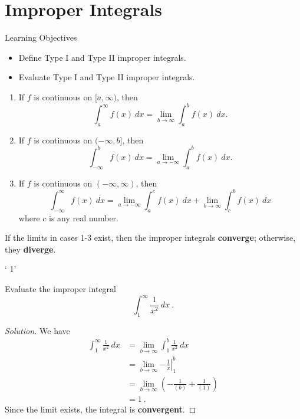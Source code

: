 \documentclass[compacto,10pt,comentarios]{aleph-notas}
\begin{document}
\encabezado

\section*{Improper Integrals}
\begin{mdframed}
    \center Learning Objectives \\
    \begin{itemize}
        \item Define Type I and Type II improper integrals.
        \item Evaluate Type I and Type II improper integrals.
    \end{itemize}
\end{mdframed}

\begin{defi}
    \begin{enumerate}
        \item If $f$ is continuous on $[a, \infty)$, then
        $$
            \int_{a}^{\infty} f(x) ~ dx = \lim_{b \to \infty} \int_{a}^{b} f(x) ~ dx.
        $$
        \item If $f$ is continuous on $(-\infty, b]$, then
        $$
            \int_{-\infty}^{b} f(x) ~ dx = \lim_{a \to -\infty} \int_{a}^{b} f(x) ~ dx .
        $$
        \item If $f$ is continuous on $(-\infty, \infty)$, then
        $$
            \int_{-\infty}^{\infty} f(x) ~ dx = \lim_{a \to -\infty} \int_{a}^{c} f(x) ~ dx + \lim_{b \to \infty} \int_{c}^{b} f(x) ~ dx 
        $$
        where $c$ is any real number.
    \end{enumerate}
    If the limits in cases 1-3 exist, then the improper integrals \textbf{converge}; otherwise, they \textbf{diverge}.
\end{defi}
`   1'
\begin{ejer}
    Evaluate the improper integral
    $$
        \int_{1}^{\infty} \frac{1}{x^{2}} ~ dx ~ .
    $$
\end{ejer}
\begin{proof}[Solution]
    We have
    \begin{align*}
        \int_{1}^{\infty} \frac{1}{x^{2}} ~ dx
            & = \lim_{b \to \infty} \int_{1}^{b} \frac{1}{x^{2}}~dx \\
            & = \lim_{b \to \infty} \left. -\frac{1}{x} \right\rvert_{1}^{b} \\
            & = \lim_{b \to \infty} \left( -\frac{1}{(b)} + \frac{1}{(1)} \right) \\
            & = 1 ~ .
    \end{align*}
    Since the limit exists, the integral is \textbf{convergent}.
\end{proof}
\end{document}
